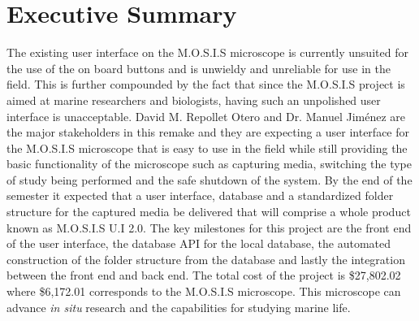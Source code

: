  \section*{Executive Summary}
 The existing user interface on the M.O.S.I.S microscope is currently unsuited for the use of the on board buttons and is unwieldy and unreliable for use in the field. This is further compounded by the fact that since the M.O.S.I.S project is aimed at marine researchers and biologists, having such an unpolished user interface is unacceptable. David M. Repollet Otero and Dr. Manuel Jiménez are the major stakeholders in this remake and they are expecting a user interface for the M.O.S.I.S microscope that is easy to use in the field while still providing the basic functionality of the microscope such as capturing media, switching the type of study being performed and the safe shutdown of the system. By the end of the semester it expected that a user interface, database and a standardized folder structure for the captured media be delivered that will comprise a whole product known as M.O.S.I.S U.I  2.0. The key milestones for this project are the front end of the user interface, the database API for the local database, the automated construction of the folder structure from the database and lastly the integration between the front end and back end. The total cost of the project is \$27,802.02 where \$6,172.01 corresponds to the M.O.S.I.S microscope. This microscope can advance \textit{in situ} research and the capabilities for studying marine life. 